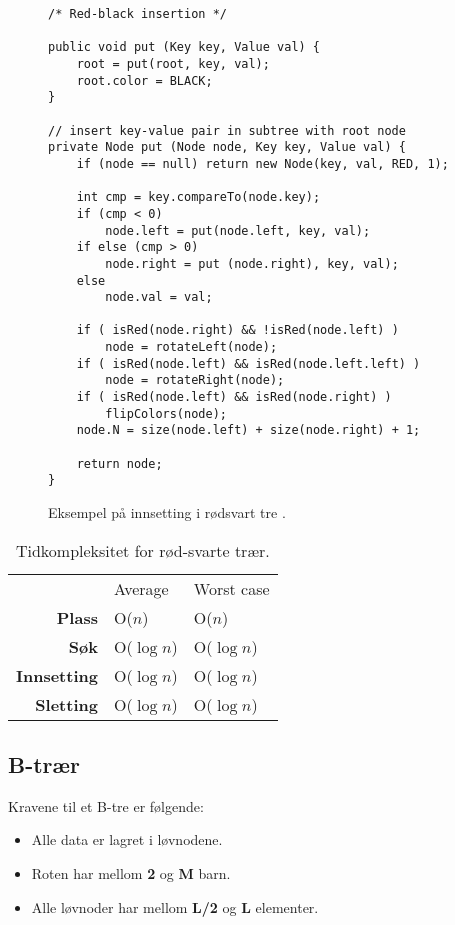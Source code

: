 \documentclass[11pt,a4paper]{article}
\theoremstyle{def}
\begin{document}
\vspace{20pt}
 
\begin{figure}[h!]
\begin{lstlisting}[frame=single]
/* Red-black insertion */

public void put (Key key, Value val) {
	root = put(root, key, val);
	root.color = BLACK;
}

// insert key-value pair in subtree with root node
private Node put (Node node, Key key, Value val) {
	if (node == null) return new Node(key, val, RED, 1);

	int cmp = key.compareTo(node.key);
	if (cmp < 0) 
		node.left = put(node.left, key, val);
	if else (cmp > 0)
		node.right = put (node.right), key, val);
	else 
		node.val = val;

	if ( isRed(node.right) && !isRed(node.left) ) 
		node = rotateLeft(node);
	if ( isRed(node.left) && isRed(node.left.left) ) 
		node = rotateRight(node);
	if ( isRed(node.left) && isRed(node.right) ) 
		flipColors(node);
	node.N = size(node.left) + size(node.right) + 1;

	return node;
}
\end{lstlisting}
\vspace{-15pt}
\caption{Eksempel på innsetting i rødsvart tre \cite{redblack}.}
\end{figure}

\begin{table}[h!]
\centering
\begin{tabular}{rll}
&Average&Worst case\\
\textbf{Plass} & O($n$) & O($n$)\\
\textbf{Søk} & O($\log n$) & O($\log n$)\\
\textbf{Innsetting} & O($\log n$) & O($\log n$)\\
\textbf{Sletting} & O($\log n$) & O($\log n$)\\
\end{tabular}
\label{tab:obst}
\caption{Tidkompleksitet for rød-svarte trær.}
\end{table}

\newpage

\subsection{B-trær}

Kravene til et B-tre er følgende:
\begin{itemize}
\item
Alle data er lagret i løvnodene.
\item
Roten har mellom \textbf{2} og \textbf{M} barn. 
\item
Alle løvnoder har mellom \textbf{L/2} og \textbf{L} elementer.
\end{itemize}
\end{document}
